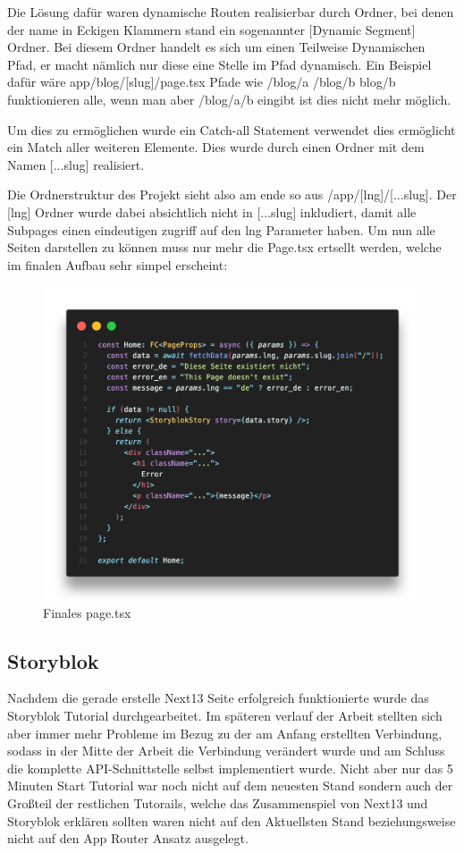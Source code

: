 Die Lösung dafür waren dynamische Routen realisierbar durch Ordner, bei denen der name in Eckigen Klammern stand ein sogenannter [Dynamic Segment] Ordner. Bei diesem Ordner handelt es sich um einen Teilweise Dynamischen Pfad, er macht nämlich nur diese eine Stelle im Pfad dynamisch. Ein Beispiel dafür wäre app/blog/[slug]/page.tsx Pfade wie /blog/a /blog/b blog/b funktionieren alle, wenn man aber /blog/a/b eingibt ist dies nicht mehr möglich. 

Um dies zu ermöglichen wurde ein Catch-all Statement verwendet dies ermöglicht ein Match aller weiteren Elemente. Dies wurde durch einen Ordner mit dem Namen [...slug] realisiert.

Die Ordnerstruktur des Projekt sieht also am ende so aus /app/[lng]/[...slug]. Der [lng] Ordner wurde dabei absichtlich nicht in [...slug] inkludiert, damit alle Subpages einen eindeutigen zugriff auf den lng Parameter haben. 
Um nun alle Seiten darstellen zu können muss nur mehr die Page.tsx ertsellt werden, welche im finalen Aufbau sehr simpel erscheint:

\begin{figure}[h]
    \centering
    \includegraphics[width=\linewidth]{pics/final-page.png}
    \caption{Finales page.tsx}
\end{figure}

\subsection{Storyblok}
Nachdem die gerade erstelle Next13 Seite erfolgreich funktionierte wurde das Storyblok Tutorial durchgearbeitet. Im späteren verlauf der Arbeit stellten sich aber immer mehr Probleme im Bezug zu der am Anfang erstellten Verbindung, sodass in der Mitte der Arbeit die Verbindung verändert wurde und am Schluss die komplette API-Schnittstelle selbst implementiert wurde.
Nicht aber nur das 5 Minuten Start Tutorial war noch nicht auf dem neuesten Stand sondern auch der Großteil der restlichen Tutorails, welche das Zusammenspiel von Next13 und Storyblok erklären sollten waren nicht auf den Aktuellsten Stand beziehungsweise nicht auf den App Router Ansatz ausgelegt.

